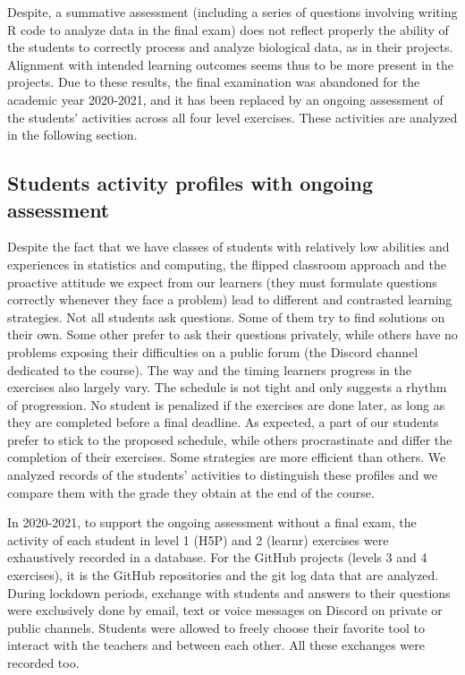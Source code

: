 \documentclass{aims}
\theoremstyle{definition}
\begin{document}
Despite, a summative assessment (including a series of questions
involving writing R code to analyze data in the final exam) does not
reflect properly the ability of the students to correctly process and
analyze biological data, as in their projects. Alignment with intended
learning outcomes seems thus to be more present in the projects. Due to
these results, the final examination was abandoned for the academic year
2020-2021, and it has been replaced by an ongoing assessment of the
students' activities across all four level exercises. These activities
are analyzed in the following section.

\hypertarget{students-activity-profiles-with-ongoing-assessment-1}{%
\subsection{Students activity profiles with ongoing
assessment}\label{students-activity-profiles-with-ongoing-assessment-1}}

Despite the fact that we have classes of students with relatively low
abilities and experiences in statistics and computing, the flipped
classroom approach and the proactive attitude we expect from our
learners (they must formulate questions correctly whenever they face a
problem) lead to different and contrasted learning strategies. Not all
students ask questions. Some of them try to find solutions on their own.
Some other prefer to ask their questions privately, while others have no
problems exposing their difficulties on a public forum (the Discord
channel dedicated to the course). The way and the timing learners
progress in the exercises also largely vary. The schedule is not tight
and only suggests a rhythm of progression. No student is penalized if
the exercises are done later, as long as they are completed before a
final deadline. As expected, a part of our students prefer to stick to
the proposed schedule, while others procrastinate and differ the
completion of their exercises. Some strategies are more efficient than
others. We analyzed records of the students' activities to distinguish
these profiles and we compare them with the grade they obtain at the end
of the course.

In 2020-2021, to support the ongoing assessment without a final exam,
the activity of each student in level 1 (H5P) and 2 (learnr) exercises
were exhaustively recorded in a database. For the GitHub projects
(levels 3 and 4 exercises), it is the GitHub repositories and the git
log data that are analyzed. During lockdown periods, exchange with
students and answers to their questions were exclusively done by email,
text or voice messages on Discord on private or public channels.
Students were allowed to freely choose their favorite tool to interact
with the teachers and between each other. All these exchanges were
recorded too.
\end{document}
